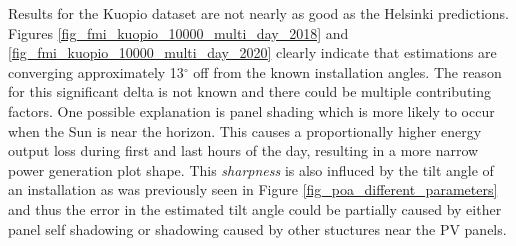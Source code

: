 \begin{figure}[!h]
\begin{floatrow}
\end{floatrow}
\end{figure}

\noindent Results for the Kuopio dataset are not nearly as good as the Helsinki predictions. Figures \ref{fig_fmi_kuopio_10000_multi_day_2018} and \ref{fig_fmi_kuopio_10000_multi_day_2020} clearly indicate that estimations are converging approximately 13$^\circ$ off from the known installation angles. The reason for this significant delta is not known and there could be multiple contributing factors. One possible explanation is panel shading which is more likely to occur when the Sun is near the horizon. This causes a proportionally higher energy output loss during first and last hours of the day, resulting in a more narrow power generation plot shape. This \textit{sharpness} is also influced by the tilt angle of an installation as was previously seen in Figure \ref{fig_poa_different_parameters} and thus the error in the estimated tilt angle could be partially caused by either panel self shadowing or shadowing caused by other stuctures near the PV panels.



